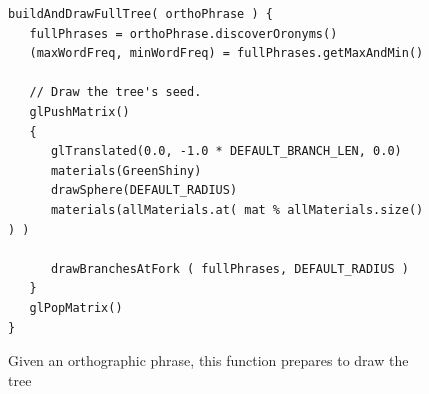 \begin{figure}
\begin{verbatim}
buildAndDrawFullTree( orthoPhrase ) {
   fullPhrases = orthoPhrase.discoverOronyms()
   (maxWordFreq, minWordFreq) = fullPhrases.getMaxAndMin()
   
   // Draw the tree's seed.
   glPushMatrix()
   {
      glTranslated(0.0, -1.0 * DEFAULT_BRANCH_LEN, 0.0)
      materials(GreenShiny)
      drawSphere(DEFAULT_RADIUS)
      materials(allMaterials.at( mat % allMaterials.size() ) )
      
      drawBranchesAtFork ( fullPhrases, DEFAULT_RADIUS )
   }
   glPopMatrix()
}
\end{verbatim}
\captionfonts
\caption[Code for buildAndDrawFullTree]{ Given an orthographic phrase, this function prepares to draw the tree }
\label{fig:psuedoCode:buildAndDrawFullTree}
\end{figure}


